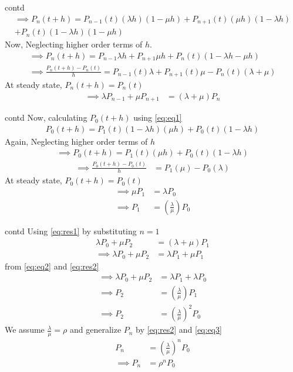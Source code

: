 \documentclass{beamer}
\providecommand{\brak}[1]{\ensuremath{\left(#1\right)}}
\begin{document}
\begin{frame}{contd}
\begin{multline}
    \implies P_{n}(t+h)=P_{n-1}(t)(\lambda h)(1-\mu h)+P_{n+1}(t)(\mu h)(1- \lambda h)\\
    +P_n(t)(1-\lambda h)(1-\mu h)
\end{multline}
Now, Neglecting higher order terms of $h$.
\begin{align}
    \implies P_{n}(t+h)=P_{n-1}\lambda h+P_{n+1}\mu h
    +P_n(t)(1-\lambda h-\mu h)\\
    \implies \frac{P_n(t+h)-P_n(t)}{h}=P_{n-1}(t)\lambda+P_{n+1}(t)\mu
    -P_n(t)(\lambda+\mu)
\end{align}
At steady state, $P_n(t+h)=P_n(t)$
\begin{align}
    \implies\lambda P_{n-1}+\mu P_{n+1}&=(\lambda+\mu)P_n\label{eq:res1}
\end{align}
\end{frame}
\begin{frame}{contd}
Now, calculating $P_0(t+h)$ using \eqref{eq:eq1}
\begin{align}
    P_0(t+h)=P_1(t)(1-\lambda h)(\mu h)
    +P_0(t)(1-\lambda h)
\end{align}
Again, Neglecting higher order terms of $h$
\begin{align}
    \implies P_0(t+h)=P_1(t)(\mu h)+P_0(t)(1-\lambda h)
    \end{align}
    \begin{align}
    \implies\frac{P_0(t+h)-P_0(t)}{h}&=P_1(\mu)-P_0(\lambda)
\end{align}
At steady state, $P_0(t+h)=P_0(t)$
\begin{align}
    \implies \mu P_1&=\lambda P_0\label{eq:eq2}\\
    \implies P_1&=\brak{\frac{\lambda}{\mu}}P_0\label{eq:res2}
\end{align}
\end{frame}
\begin{frame}{contd}
Using \eqref{eq:res1} by substituting $n=1$
\begin{align}
    \lambda P_0+\mu P_2&=(\lambda+\mu)P_1\\
    \implies \lambda P_0+\mu P_2&=\lambda P_1+\mu P_1
\end{align}
from \eqref{eq:eq2} and \eqref{eq:res2}
\begin{align}
    \implies\lambda P_0+\mu P_2&=\lambda P_1+\lambda P_0\\
    \implies P_2&=\brak{\frac{\lambda}{\mu}}P_1\\
    \implies P_2&=\brak{\frac{\lambda}{\mu}}^2P_0\label{eq:eq3}
\end{align}
We assume $\frac{\lambda}{\mu}=\rho$ and generalize $P_n$ by \eqref{eq:res2} and \eqref{eq:eq3}
\begin{align}
  P_n&=\brak{\frac{\lambda}{\mu}}^nP_0\\
  \implies P_n&=\rho^nP_0\label{eq:res3}
\end{align}
\end{frame}
\end{document}
